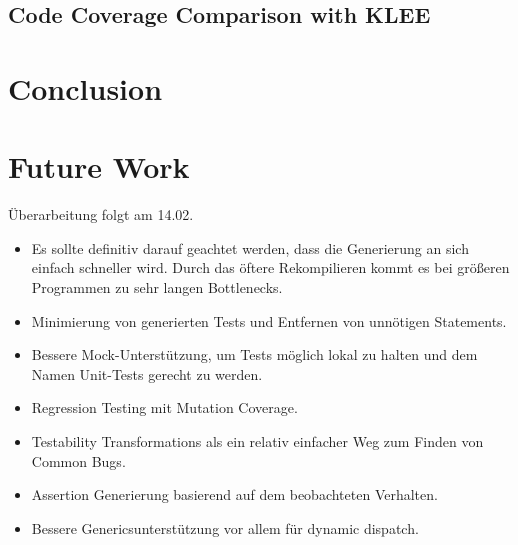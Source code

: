 \documentclass{article}
\begin{document}
\subsection{Code Coverage Comparison with KLEE}

\newpage
\section{Conclusion}

\newpage
\section{Future Work}
Überarbeitung folgt am 14.02.

\begin{itemize}
    \item Es sollte definitiv darauf geachtet werden, dass die Generierung an sich einfach schneller wird. Durch das öftere Rekompilieren kommt es bei größeren Programmen zu sehr langen Bottlenecks.
    \item Minimierung von generierten Tests und Entfernen von unnötigen Statements.
    \item Bessere Mock-Unterstützung, um Tests möglich lokal zu halten und dem Namen Unit-Tests gerecht zu werden.
    \item Regression Testing mit Mutation Coverage.
    \item Testability Transformations als ein relativ einfacher Weg zum Finden von Common Bugs.
    \item Assertion Generierung basierend auf dem beobachteten Verhalten.
    \item Bessere Genericsunterstützung vor allem für dynamic dispatch.
\end{itemize}

\newpage
\appendix


\newpage


\end{document}
